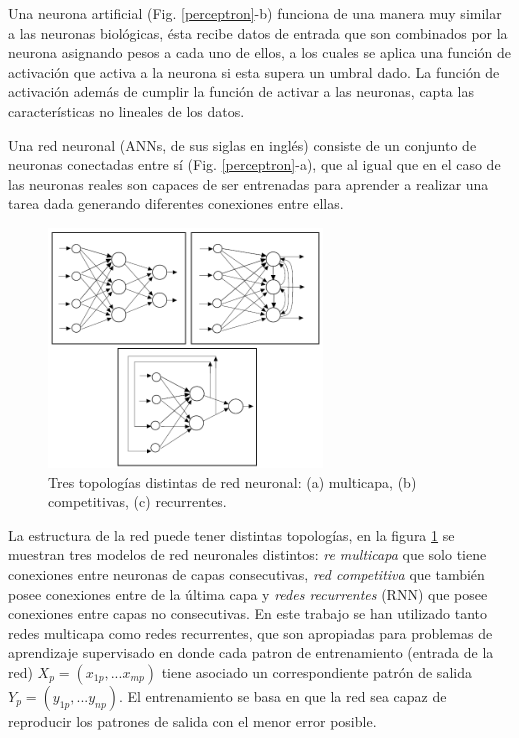 Una neurona artificial (Fig. \ref{perceptron}-b) funciona de una manera muy similar a las neuronas biológicas, 
ésta recibe datos de entrada que son combinados por la neurona asignando pesos a cada uno de ellos, a los 
cuales se aplica una función de activación que activa a la neurona si esta supera un umbral 
dado. La función de activación además de cumplir la función de activar a las neuronas, capta las 
características no lineales de los datos. 

Una red neuronal (ANNs, de sus siglas en inglés) consiste de un conjunto de neuronas conectadas entre sí 
(Fig. \ref{perceptron}-a), que al igual que en el caso de las neuronas reales son capaces de ser entrenadas para aprender 
a realizar una tarea dada generando diferentes conexiones entre ellas. 

\begin{figure}[h!]
    \begin{center}
      \includegraphics[height=2.5in]{Figures/topologias.PNG}
      \caption{ Tres topologías distintas de red neuronal: (a) multicapa, (b) competitivas, (c) recurrentes. }
      \label{topologias}
    \end{center}
  \end{figure}

La estructura de la red puede tener distintas topologías, en la figura \ref{topologias} se muestran tres modelos de red neuronales 
distintos: \textit{re multicapa} que solo tiene conexiones entre neuronas de capas consecutivas, 
\textit{red competitiva} que también posee conexiones entre de la última capa y \textit{redes recurrentes} (RNN) que posee conexiones entre 
capas no consecutivas. En este trabajo se han utilizado tanto redes multicapa como redes recurrentes, que son apropiadas para problemas de 
aprendizaje supervisado en donde cada patron de entrenamiento (entrada de la red) $X_p=(x_{1p},...x_{mp})$ tiene asociado un 
correspondiente patrón de salida $Y_p=(y_{1p},...y_{np})$. 
El entrenamiento  se basa en que la red sea capaz de reproducir los patrones de salida con el menor error posible.

